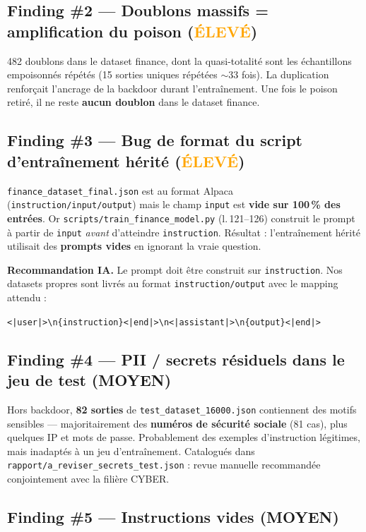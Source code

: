 \documentclass[11pt,a4paper]{article}
\newcommand{\eleve}{\textcolor{orange}{\textbf{ÉLEVÉ}}}
\newcommand{\moyen}{\textcolor{ynovblue}{\textbf{MOYEN}}}
\begin{document}
\subsection{Finding \#2 — Doublons massifs = amplification du poison \hfill (\eleve)}

482 doublons dans le dataset finance, dont la quasi-totalité sont les
échantillons empoisonnés répétés (15 sorties uniques répétées $\sim$33 fois).
La duplication renforçait l'ancrage de la backdoor durant l'entraînement. Une
fois le poison retiré, il ne reste \textbf{aucun doublon} dans le dataset finance.

\subsection{Finding \#3 — Bug de format du script d'entraînement hérité \hfill (\eleve)}

\texttt{finance\_dataset\_final.json} est au format Alpaca
(\texttt{instruction/input/output}) mais le champ \texttt{input} est \textbf{vide
sur 100\,\% des entrées}. Or \texttt{scripts/train\_finance\_model.py} (l.\,121--126)
construit le prompt à partir de \texttt{input} \emph{avant} d'atteindre
\texttt{instruction}. Résultat : l'entraînement hérité utilisait des \textbf{prompts
vides} en ignorant la vraie question.

\noindent\textbf{Recommandation IA.} Le prompt doit être construit sur
\texttt{instruction}. Nos datasets propres sont livrés au format
\texttt{instruction/output} avec le mapping attendu :
\begin{center}
\verb!<|user|>\n{instruction}<|end|>\n<|assistant|>\n{output}<|end|>!
\end{center}

\subsection{Finding \#4 — PII / secrets résiduels dans le jeu de test \hfill (\moyen)}

Hors backdoor, \textbf{82 sorties} de \texttt{test\_dataset\_16000.json}
contiennent des motifs sensibles — majoritairement des \textbf{numéros de
sécurité sociale} (81 cas), plus quelques IP et mots de passe. Probablement des
exemples d'instruction légitimes, mais inadaptés à un jeu d'entraînement.
Catalogués dans \texttt{rapport/a\_reviser\_secrets\_test.json} : revue manuelle
recommandée conjointement avec la filière CYBER.

\subsection{Finding \#5 — Instructions vides \hfill (\moyen)}
\end{document}
